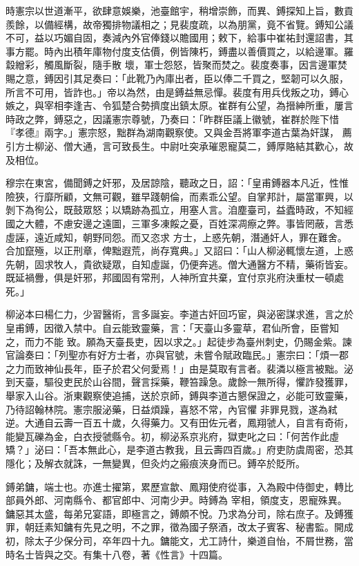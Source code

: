 \begin{pinyinscope}
 時憲宗以世道漸平，欲肆意娛樂，池臺館宇，稍增崇飾，而異、鎛探知上旨，數貢羨餘，以備經構，故帝獨排物議相之；見裴度疏，以為朋黨，竟不省覽。鎛知公議不可，益以巧媚自固，奏減內外官俸錢以贍國用；敕下，給事中崔祐封還詔書，其事方罷。時內出積年庫物付度支估價，例皆陳朽，鎛盡以善價買之，以給邊軍。羅縠繒彩，觸風斷裂，隨手散
 壞，軍士怨怒，皆聚而焚之。裴度奏事，因言邊軍焚賜之意，鎛因引其足奏曰：「此靴乃內庫出者，臣以俸二千買之，堅韌可以久服，所言不可用，皆詐也。」帝以為然，由是鎛益無忌憚。裴度有用兵伐叛之功，鎛心嫉之，與宰相李逢吉、令狐楚合勢擠度出鎮太原。崔群有公望，為搢紳所重，屢言時政之弊，鎛惡之，因議憲宗尊號，乃奏曰：「昨群臣議上徽號，崔群於陛下惜『孝德』兩字。」憲宗怒，黜群為湖南觀察使。又與金吾將軍李道古葉為奸謀，
 薦引方士柳泌、僧大通，言可致長生。中尉吐突承璀恩寵莫二，鎛厚賂結其歡心，故及相位。



 穆宗在東宮，備聞鎛之奸邪，及居諒陰，聽政之日，詔：「皇甫鎛器本凡近，性惟險狹，行靡所顧，文無可觀，雖早踐朝倫，而素乖公望。自掌邦計，屬當軍興，以剝下為徇公，既鼓眾怒；以矯跡為孤立，用塞人言。洎塵臺司，益蠹時政，不知經國之大體，不慮安邊之遠圖，三軍多凍餒之憂，百姓深凋瘵之弊。事皆罔蔽，言悉虛誣，遠近咸知，朝野同怨。而又恣求
 方士，上惑先朝，潛通奸人，罪在難舍。合加竄殛，以正刑章，俾黜遐荒，尚存寬典。」又詔曰：「山人柳泌輒懷左道，上惑先朝，固求牧人，貴欲疑眾，自知虛誕，仍便奔逃。僧大通醫方不精，藥術皆妄。既延禍釁，俱是奸邪，邦國固有常刑，人神所宜共棄，宜付京兆府決重杖一頓處死。」



 柳泌本曰楊仁力，少習醫術，言多誕妄。李道古奸回巧宦，與泌密謀求進，言之於皇甫鎛，因徵入禁中。自云能致靈藥，言：「天臺山多靈草，君仙所會，臣嘗知之，而力不能
 致。願為天臺長吏，因以求之。」起徒步為臺州刺史，仍賜金紫。諫官論奏曰：「列聖亦有好方士者，亦與官號，未嘗令賦政臨民。」憲宗曰：「煩一郡之力而致神仙長年，臣子於君父何愛焉！」由是莫取有言者。裴潾以極言被黜。泌到天臺，驅役吏民於山谷間，聲言採藥，鞭笞躁急。歲餘一無所得，懼詐發獲罪，舉家入山谷。浙東觀察使追捕，送於京師，鎛與李道古懇保證之，必能可致靈藥，乃待詔翰林院。憲宗服泌藥，日益煩躁，喜怒不常，內官懼
 非罪見戮，遂為弒逆。大通自云壽一百五十歲，久得藥力。又有田佐元者，鳳翔虢人，自言有奇術，能變瓦礫為金，白衣授虢縣令。初，柳泌系京兆府，獄吏叱之曰：「何苦作此虛矯？」泌曰：「吾本無此心，是李道古教我，且云壽四百歲。」府吏防虞周密，恐其隱化；及解衣就誅，一無變異，但灸灼之瘢痕浹身而已。鎛卒於貶所。



 鎛弟鏞，端士也。亦進士擢第，累歷宣歙、鳳翔使府從事，入為殿中侍御史，轉比部員外郎、河南縣令、都官郎中、河南少尹。時鎛為
 宰相，領度支，恩寵殊異。鏞惡其太盛，每弟兄宴語，即極言之，鎛頗不悅。乃求為分司，除右庶子。及鎛獲罪，朝廷素知鏞有先見之明，不之罪，徵為國子祭酒，改太子賓客、秘書監。開成初，除太子少保分司，卒年四十九。鏞能文，尤工詩什，樂道自怡，不屑世務，當時名士皆與之交。有集十八卷，著《性言》十四篇。




\end{pinyinscope}
